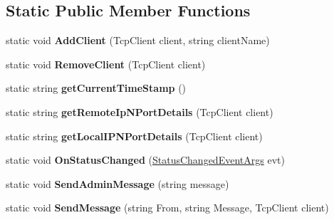 \subsection*{Static Public Member Functions}
\begin{DoxyCompactItemize}
\item 
\hypertarget{class_server_library_1_1_t_c_p_server_a808977357a2a58497532ee3cfa9c1d83}{
static void {\bfseries AddClient} (TcpClient client, string clientName)}
\label{class_server_library_1_1_t_c_p_server_a808977357a2a58497532ee3cfa9c1d83}

\item 
\hypertarget{class_server_library_1_1_t_c_p_server_aa276a2fcf2aa45d51eb3aaeac4bb2b3f}{
static void {\bfseries RemoveClient} (TcpClient client)}
\label{class_server_library_1_1_t_c_p_server_aa276a2fcf2aa45d51eb3aaeac4bb2b3f}

\item 
\hypertarget{class_server_library_1_1_t_c_p_server_a9109c1cf690b57bda767cd5c8a4977dd}{
static string {\bfseries getCurrentTimeStamp} ()}
\label{class_server_library_1_1_t_c_p_server_a9109c1cf690b57bda767cd5c8a4977dd}

\item 
\hypertarget{class_server_library_1_1_t_c_p_server_a3f22db079ae4644438117c74fb3e8b99}{
static string {\bfseries getRemoteIpNPortDetails} (TcpClient client)}
\label{class_server_library_1_1_t_c_p_server_a3f22db079ae4644438117c74fb3e8b99}

\item 
\hypertarget{class_server_library_1_1_t_c_p_server_aa08548525320a44ad7180030365042b7}{
static string {\bfseries getLocalIPNPortDetails} (TcpClient client)}
\label{class_server_library_1_1_t_c_p_server_aa08548525320a44ad7180030365042b7}

\item 
\hypertarget{class_server_library_1_1_t_c_p_server_a846774398acee782e25f5bf92e077af8}{
static void {\bfseries OnStatusChanged} (\hyperlink{class_server_library_1_1_status_changed_event_args}{StatusChangedEventArgs} evt)}
\label{class_server_library_1_1_t_c_p_server_a846774398acee782e25f5bf92e077af8}

\item 
\hypertarget{class_server_library_1_1_t_c_p_server_a9fa2fd8235edc929d641cd3ea1d4b1a9}{
static void {\bfseries SendAdminMessage} (string message)}
\label{class_server_library_1_1_t_c_p_server_a9fa2fd8235edc929d641cd3ea1d4b1a9}

\item 
\hypertarget{class_server_library_1_1_t_c_p_server_ac37fb88ad987e61148a4438eda1f8560}{
static void {\bfseries SendMessage} (string From, string Message, TcpClient client)}
\label{class_server_library_1_1_t_c_p_server_ac37fb88ad987e61148a4438eda1f8560}

\end{DoxyCompactItemize}
